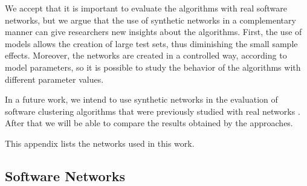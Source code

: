 We accept that it is important to evaluate the algorithms with real software
networks, but we argue that the use of synthetic networks in a complementary
manner can give researchers new insights about the algorithms. First, the use of
models allows the creation of large test sets, thus diminishing the small sample
effects. Moreover, the networks are created in a controlled way, according to
model parameters, so it is possible to study the behavior of the algorithms with
different parameter values.

In a future work, we intend to use synthetic networks in the evaluation of
software clustering algorithms that were previously studied with real networks
\cite{Wu2005}. After that we will be able to compare the results obtained by
the approaches.

\appendix %

This appendix lists the networks used in this work.

\subsection{Software Networks}

